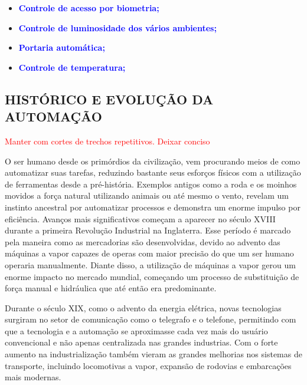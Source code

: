 \begin{itemize}
                \begin{itemize}
                        \item \textbf{\textcolor{blue}{Controle de acesso por biometria;}} 
                        \item \textbf{\textcolor{blue}{Controle de luminosidade dos vários ambientes;}} 
                        \item \textbf{\textcolor{blue}{Portaria automática;}}
                        \item \textbf{\textcolor{blue}{Controle de temperatura;}}
                    \end{itemize}
                
                
        \end{itemize}

    \subsection{HISTÓRICO E EVOLUÇÃO DA AUTOMAÇÃO}

        \textcolor{red}{Manter com cortes de trechos repetitivos. Deixar conciso}
    
        O ser humano desde os primórdios da civilização, vem procurando meios de como automatizar suas tarefas, reduzindo bastante seus esforços físicos com a utilização de ferramentas desde a pré-história. Exemplos antigos como a roda e os moinhos movidos a força natural utilizando animais ou até mesmo o vento, revelam um instinto ancestral por automatizar processos e demonstra um enorme impulso por eficiência. Avanços mais significativos começam a aparecer no século XVIII durante a primeira Revolução Industrial na Inglaterra.  Esse período é marcado pela maneira como as mercadorias são desenvolvidas, devido ao advento das máquinas a vapor capazes de operas com maior precisão do que um ser humano operaria manualmente. Diante disso, a utilização de máquinas a vapor gerou um enorme impacto no mercado mundial, começando um processo de substituição de força manual e hidráulica que até então era predominante.

        Durante o século XIX, como o advento da energia elétrica, novas tecnologias surgiram no setor de comunicação como o telegrafo e o telefone, permitindo com que a tecnologia e a automação se aproximasse cada vez mais do usuário convencional e não apenas centralizada nas grandes industrias\cite{adventoMidias}. Com o forte aumento na industrialização também vieram as grandes melhorias nos sistemas de transporte, incluindo locomotivas a vapor, expansão de rodovias e embarcações mais modernas.


